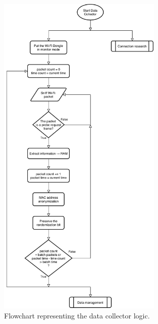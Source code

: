 \begin{figure}[h]
\centering 
\includegraphics[width=0.7\textwidth]{images/flowcollect} 
\caption{Flowchart representing the data collector logic.}
\label{fig:flowcollect}
\end{figure}

